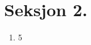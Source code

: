 \section*{Seksjon 2.}

\begin{problem}[18]
  \begin{enumerate}
  \addtocounter{enumii}{1}
    \item 5 
  \end{enumerate}
\end{problem}


